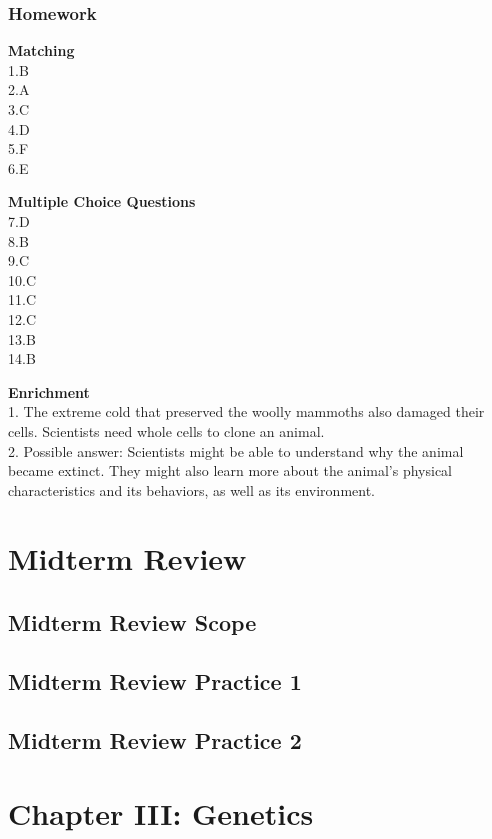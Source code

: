 \documentclass[
]{book}
\begin{document}
\hypertarget{homework-4}{%
\subsection{Homework}\label{homework-4}}

\textbf{Matching}\\
1.B\\
2.A\\
3.C\\
4.D\\
5.F\\
6.E

\textbf{Multiple Choice Questions}\\
7.D\\
8.B\\
9.C\\
10.C\\
11.C\\
12.C\\
13.B\\
14.B

\textbf{Enrichment}\\
1. The extreme cold that preserved the woolly mammoths also damaged their cells.
Scientists need whole cells to clone an animal.\\
2. Possible answer: Scientists might be able to understand why the animal became
extinct. They might also learn more about the animal's physical characteristics and its behaviors, as well as its environment.

\hypertarget{midterm-review}{%
\chapter{Midterm Review}\label{midterm-review}}

\hypertarget{midterm-review-scope}{%
\section{Midterm Review Scope}\label{midterm-review-scope}}

\hypertarget{midterm-review-practice-1}{%
\section{Midterm Review Practice 1}\label{midterm-review-practice-1}}

\hypertarget{midterm-review-practice-2}{%
\section{Midterm Review Practice 2}\label{midterm-review-practice-2}}

\hypertarget{chapter-iii-genetics}{%
\chapter{Chapter III: Genetics}\label{chapter-iii-genetics}}

  
\end{document}
